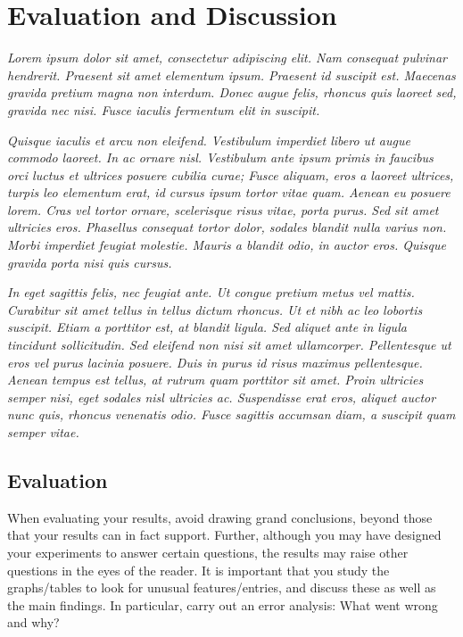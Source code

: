 \chapter{Evaluation and Discussion}
\label{cha:discussion}

\textit{Lorem ipsum dolor sit amet, consectetur adipiscing elit. Nam consequat pulvinar hendrerit. Praesent sit amet elementum ipsum. Praesent id suscipit est. Maecenas gravida pretium magna non interdum. Donec augue felis, rhoncus quis laoreet sed, gravida nec nisi. Fusce iaculis fermentum elit in suscipit.}

\textit{Quisque iaculis et arcu non eleifend. Vestibulum imperdiet libero ut augue commodo laoreet. In ac ornare nisl. Vestibulum ante ipsum primis in faucibus orci luctus et ultrices posuere cubilia curae; Fusce aliquam, eros a laoreet ultrices, turpis leo elementum erat, id cursus ipsum tortor vitae quam. Aenean eu posuere lorem. Cras vel tortor ornare, scelerisque risus vitae, porta purus. Sed sit amet ultricies eros. Phasellus consequat tortor dolor, sodales blandit nulla varius non. Morbi imperdiet feugiat molestie. Mauris a blandit odio, in auctor eros. Quisque gravida porta nisi quis cursus.}

\textit{In eget sagittis felis, nec feugiat ante. Ut congue pretium metus vel mattis. Curabitur sit amet tellus in tellus dictum rhoncus. Ut et nibh ac leo lobortis suscipit. Etiam a porttitor est, at blandit ligula. Sed aliquet ante in ligula tincidunt sollicitudin. Sed eleifend non nisi sit amet ullamcorper. Pellentesque ut eros vel purus lacinia posuere. Duis in purus id risus maximus pellentesque. Aenean tempus est tellus, at rutrum quam porttitor sit amet. Proin ultricies semper nisi, eget sodales nisl ultricies ac. Suspendisse erat eros, aliquet auctor nunc quis, rhoncus venenatis odio. Fusce sagittis accumsan diam, a suscipit quam semper vitae.}

\section{Evaluation}
\label{sec:evaluation}

When evaluating your results, avoid drawing grand conclusions, beyond those that your results can in fact support. 
Further, although you may have designed your experiments to answer certain questions, 
the results may raise other questions in the eyes of the reader. 
It is important that you study the graphs/tables to look for unusual features/entries, and discuss these as well as the main findings.
In particular, carry out an error analysis: What went wrong and why? 

